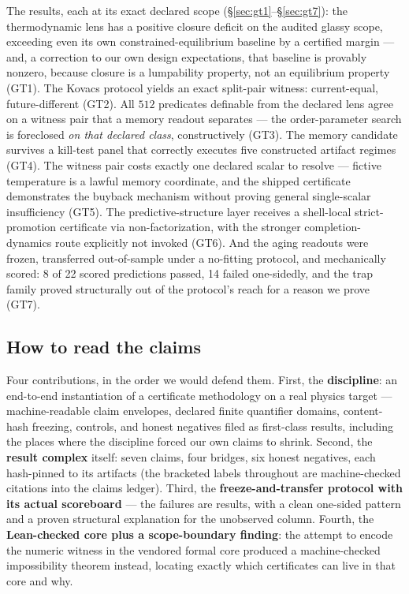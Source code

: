 \documentclass[11pt]{article}
\theoremstyle{definition}
\begin{document}
The results, each at its exact declared scope (\S\ref{sec:gt1}--\S\ref{sec:gt7}): the
thermodynamic lens has a positive closure deficit on the audited glassy scope, exceeding even its
own constrained-equilibrium baseline by a certified margin --- and, a correction to our own design
expectations, that baseline is provably nonzero, because closure is a lumpability property, not an
equilibrium property (GT1). The Kovacs protocol yields an exact split-pair witness:
current-equal, future-different (GT2). All $512$ predicates definable from the declared lens
agree on a witness pair that a memory readout separates --- the order-parameter search is
foreclosed \emph{on that declared class}, constructively (GT3). The memory candidate survives a
kill-test panel that correctly executes five constructed artifact regimes (GT4). The witness pair
costs exactly one declared scalar to resolve --- fictive temperature is a lawful memory coordinate,
and the shipped certificate demonstrates the buyback mechanism without proving general
single-scalar insufficiency (GT5). The predictive-structure layer receives a shell-local
strict-promotion certificate via non-factorization, with the stronger completion-dynamics route
explicitly not invoked (GT6). And the aging readouts were frozen, transferred out-of-sample under
a no-fitting protocol, and mechanically scored: 8 of 22 scored predictions passed, 14 failed
one-sidedly, and the trap family proved structurally out of the protocol's reach for a reason we
prove (GT7).

\subsection{How to read the claims}

Four contributions, in the order we would defend them. First, the \textbf{discipline}: an
end-to-end instantiation of a certificate methodology on a real physics target --- machine-readable
claim envelopes, declared finite quantifier domains, content-hash freezing, controls, and honest
negatives filed as first-class results, including the places where the discipline forced our own
claims to shrink. Second, the \textbf{result complex} itself: seven claims, four bridges, six
honest negatives, each hash-pinned to its artifacts (the bracketed labels throughout are
machine-checked citations into the claims ledger). Third, the \textbf{freeze-and-transfer
protocol with its actual scoreboard} --- the failures are results, with a clean one-sided pattern
and a proven structural explanation for the unobserved column. Fourth, the \textbf{Lean-checked
core plus a scope-boundary finding}: the attempt to encode the numeric witness in the vendored
formal core produced a machine-checked impossibility theorem instead, locating exactly which
certificates can live in that core and why.
\end{document}
